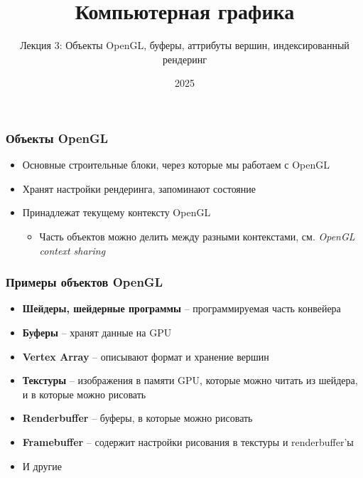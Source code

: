 \documentclass[10pt]{beamer}
\title{Компьютерная графика}
\subtitle{Лекция 3: Объекты OpenGL, буферы, аттрибуты вершин, индексированный рендеринг}
\date{2025}
\begin{document}
\frame{\titlepage}

\begin{frame}[fragile]
\frametitle{Объекты OpenGL}
\begin{itemize}
\item Основные строительные блоки, через которые мы работаем с OpenGL
\pause
\item Хранят настройки рендеринга, запоминают состояние
\pause
\item Принадлежат текущему контексту OpenGL
\pause
\begin{itemize}
\item Часть объектов можно делить между разными контекстами, см. \textit{OpenGL context sharing}
\end{itemize}
\end{itemize}
\end{frame}

\begin{frame}[fragile]
\frametitle{Примеры объектов OpenGL}
\begin{itemize}
\item \textbf{Шейдеры, шейдерные программы} -- программируемая часть конвейера
\pause
\item \textbf{Буферы} -- хранят данные на GPU
\pause
\item \textbf{Vertex Array} -- описывают формат и хранение вершин
\pause
\item \textbf{Текстуры} -- изображения в памяти GPU, которые можно читать из шейдера, и в которые можно рисовать
\pause
\item \textbf{Renderbuffer} -- буферы, в которые можно рисовать
\pause
\item \textbf{Framebuffer} -- содержит настройки рисования в текстуры и renderbuffer'ы
\pause
\item И другие
\end{itemize}
\end{frame}
\end{document}
